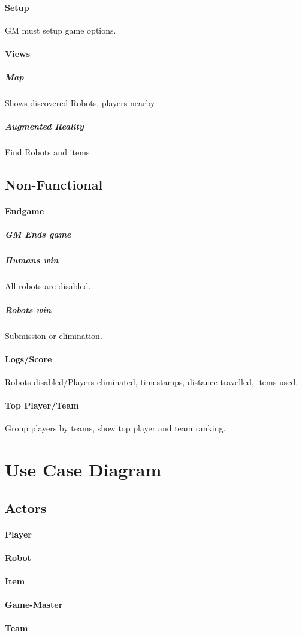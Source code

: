 \documentclass{article}
\begin{document}
\paragraph{Setup}
GM must setup game options.
\paragraph{Views}
\subparagraph{Map}
Shows discovered Robots, players nearby
\subparagraph{Augmented Reality}
Find Robots and items
\subsection{Non-Functional}
\paragraph{Endgame}
\subparagraph{GM Ends game}
\subparagraph{Humans win}
All robots are disabled.
\subparagraph{Robots win}
Submission or elimination.
\paragraph{Logs/Score}
Robots disabled/Players eliminated, timestamps, distance travelled, items used.
\paragraph{Top Player/Team}
Group players by teams, show top player and team ranking.
\section{Use Case Diagram}
\subsection{Actors}
\paragraph{Player}
\paragraph{Robot}
\paragraph{Item}
\paragraph{Game-Master}
\paragraph{Team}
\end{document}
